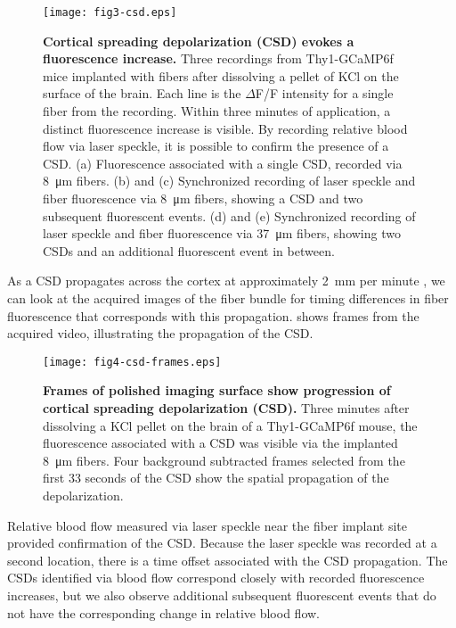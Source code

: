 \begin{figure}
\texttt{[image: fig3-csd.eps]}
\caption[Recording of fluorescence during CSD]{\textbf{Cortical spreading depolarization (CSD) evokes a fluorescence 
increase.} Three recordings from Thy1-GCaMP6f mice implanted with 
fibers after dissolving a pellet of KCl on the surface of the brain. 
Each line is the $\Delta$F/F intensity for a single fiber from the 
recording. Within three minutes of application, a distinct 
fluorescence increase is visible. By recording relative blood flow via
 laser speckle, it is possible to confirm the presence of a CSD. (a) 
Fluorescence associated with a single CSD, recorded via 
8~\si{\micro\meter} fibers. (b) and (c) Synchronized recording of 
laser speckle and fiber fluorescence via 8~\si{\micro\meter} fibers, 
showing a CSD and two subsequent fluorescent events. (d) and (e) 
Synchronized recording of laser speckle and fiber fluorescence via 
37~\si{\micro\meter} fibers, showing two CSDs and an additional 
fluorescent event in between.}
\label{fig:csd}
\end{figure}

As a CSD propagates across the cortex at approximately 
2~\si{\milli\meter} per minute \cite{Ochs:1960jx,Pietrobon:2014gn}, we
 can look at the acquired images of the fiber bundle for timing 
differences in fiber fluorescence that corresponds with this 
propagation.  shows frames from the acquired video, 
illustrating the propagation of the CSD.

\begin{figure}
\texttt{[image: fig4-csd-frames.eps]}
\caption[Images of fiber bundle during CSD]{\textbf{Frames of polished imaging surface show progression of cortical 
spreading depolarization (CSD).} Three minutes after dissolving
 a KCl pellet on the brain of a Thy1-GCaMP6f mouse, the fluorescence 
associated with a CSD was visible via the implanted 
8~\si{\micro\meter} fibers. Four background subtracted frames selected
 from the first 33 seconds of the CSD show the spatial propagation of 
the depolarization.}
\label{fig:csd-frames}
\end{figure}

Relative blood flow measured via laser speckle near the fiber implant 
site provided confirmation of the CSD. Because the laser speckle was 
recorded at a second location, there is a time offset associated with 
the CSD propagation. The CSDs identified via blood flow correspond 
closely with recorded fluorescence increases, but we also observe 
additional subsequent fluorescent events that do not have the 
corresponding change in relative blood flow.

